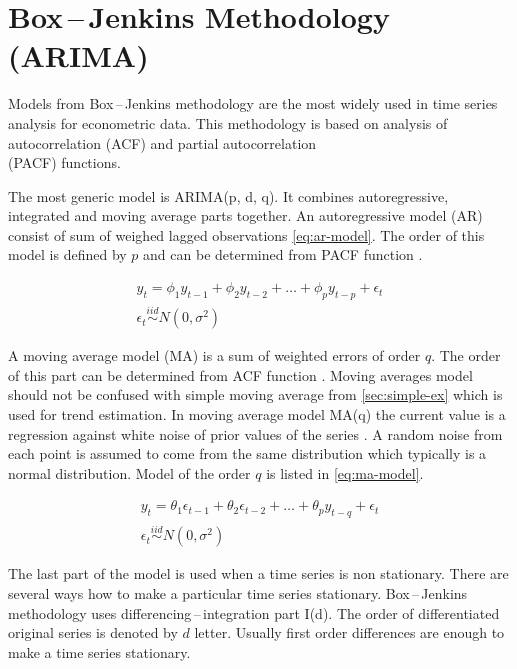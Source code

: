     \section{Box\,--\,Jenkins Methodology (ARIMA)} \label{sec:arima}
    Models from Box\,--\,Jenkins methodology are the most widely used in time series analysis for econometric data.
    This methodology is based on analysis of autocorrelation (ACF) and partial autocorrelation \\(PACF) functions.
    
    The most generic model is ARIMA(p, d, q). It combines autoregressive, integrated and moving average parts together.
    An autoregressive model (AR) consist of sum of weighed lagged observations \ref{eq:ar-model}.
    The order of this model is defined by $p$ and can be determined from PACF function \cite{cipra}.

    \begin{gather} \label{eq:ar-model}
        y_t = \phi_1 y_{t-1} + \phi_2 y_{t-2} + \dots + \phi_p y_{t-p} + \epsilon_t \\ \nonumber
        \epsilon_t \overset{iid}{\sim} N(0, \sigma^2)
    \end{gather}

    A moving average model (MA) is a sum of weighted errors of order $q$. The order of this part can be determined
    from ACF function \cite{cipra}. Moving averages model should not be confused with simple moving average from
    \ref{sec:simple-ex} which is used for trend estimation. In moving average model MA(q) the current value is a
    regression against white noise of prior values of the series \cite{wiki-ma-model}. A random noise from each
    point is assumed to come from the same distribution which typically is a normal distribution.  Model of the order
    $q$ is listed in \ref{eq:ma-model}.

    \begin{gather} \label{eq:ma-model}
        y_t = \theta_1 \epsilon_{t-1} + \theta_2 \epsilon_{t-2} + \dots + \theta_p y_{t-q} + \epsilon_t \\ \nonumber
        \epsilon_t \overset{iid}{\sim} N(0, \sigma^2)
    \end{gather}

    The last part of the model is used when a time series is non stationary. There are several ways how to make a
    particular time series stationary. Box\,--\,Jenkins methodology uses differencing\,--\,integration part I(d).  The
    order of differentiated original series is denoted by $d$ letter. Usually first order differences are enough to
    make a time series stationary.

